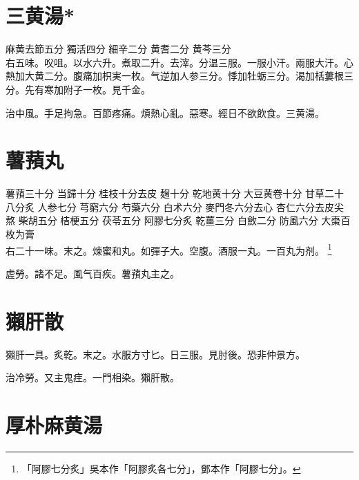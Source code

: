 \section{三黄湯*}

麻黄{\scriptsize 去節五分} 獨活{\scriptsize 四分} 細辛{\scriptsize 二分} 黄耆{\scriptsize 二分} 黄芩{\scriptsize 三分}\\
右五味。㕮咀。以水六升。煮取二升。去滓。分温三服。一服小汗。兩服大汗。心熱加大黄二分。腹痛加枳実一枚。气逆加人参三分。悸加牡蛎三分。渴加栝蔞根三分。先有寒加附子一枚。{\scriptsize 見千金。}

治中風。手足拘急。百節疼痛。煩熱心亂。惡寒。經日不欲飲食。三黄湯。

\section{薯蕷丸}

薯蕷{\scriptsize 三十分} 当歸{\scriptsize 十分} 桂枝{\scriptsize 十分去皮} 麹{\scriptsize 十分} 乾地黄{\scriptsize 十分} 大豆黄卷{\scriptsize 十分} 甘草{\scriptsize 二十八分炙} 人参{\scriptsize 七分} 芎窮{\scriptsize 六分} 芍藥{\scriptsize 六分} 白术{\scriptsize 六分} 麥門冬{\scriptsize 六分去心} 杏仁{\scriptsize 六分去皮尖熬} 柴胡{\scriptsize 五分} 桔梗{\scriptsize 五分} 茯苓{\scriptsize 五分} 阿膠{\scriptsize 七分炙} 乾薑{\scriptsize 三分} 白斂{\scriptsize 二分} 防風{\scriptsize 六分} 大棗{\scriptsize 百枚为膏}\\
右二十一味。末之。煉蜜和丸。如彈子大。空腹。酒服一丸。一百丸为剂。
	\footnote{
		「阿膠七分炙」吳本作「阿膠炙各七分」，鄧本作「阿膠七分」。
	}

虗勞。諸不足。風气百疾。薯蕷丸主之。

\section{獺肝散}

獺肝一具。炙乾。末之。水服方寸匕。日三服。{\scriptsize 見肘後。恐非仲景方。}{\wuben}


治冷勞。又主鬼疰。一門相染。獺肝散。

\section{厚朴麻黄湯}

